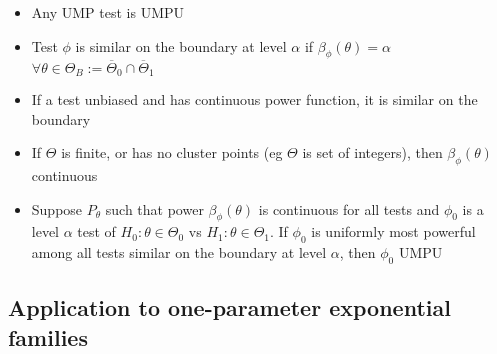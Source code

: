 \documentclass[fontsize=5pt]{scrartcl}
\begin{document}
\begin{multicols}{2}
\begin{itemize}
\item Any UMP test is UMPU

\item Test $\phi$ is similar on the boundary at level $\alpha$ if
  $\beta_{\phi}(\theta)=\alpha$ $\forall\theta\in\Theta_{B}:=
  \overline{\Theta}_{0}\cap \overline{\Theta}_{1}$

\item If a test unbiased and has continuous power function, it is
  similar on the boundary
\item If $\Theta$ is finite, or has no cluster points (eg $\Theta$ is
  set of integers), then $\beta_{\phi}(\theta)$ continuous
\item Suppose $P_{\theta}$ such that power $\beta_{\phi}(\theta)$ is
  continuous for all tests and $\phi_{0}$ is a level $\alpha$ test of
  $H_{0}:\theta\in\Theta_{0}$ vs $H_{1}:\theta\in\Theta_{1}$. If
  $\phi_{0}$ is uniformly most powerful among all tests similar on the
  boundary at level $\alpha$, then $\phi_{0}$ UMPU
\end{itemize}

\subsection{Application to one-parameter exponential families}


\end{multicols}
\end{document}
